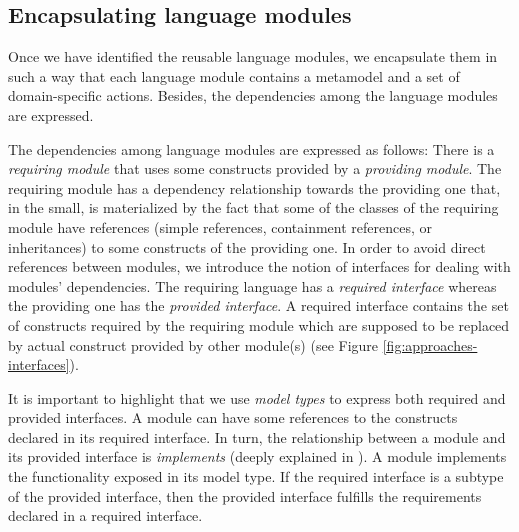 
\subsection{Encapsulating language modules}

Once we have identified the reusable language modules, we encapsulate them in such a way that each language module contains a metamodel and a set of domain-specific actions. Besides, the dependencies among the language modules are expressed. %

The dependencies among language modules are expressed as follows: There is a \textit{requiring module} that uses some constructs provided by a \textit{providing module}. The requiring module has a dependency relationship towards the providing one that, in the small, is materialized by the fact that some of the classes of the requiring module have references (simple references, containment references, or inheritances) to some constructs of the providing one. In order to avoid direct references between modules, we introduce the notion of interfaces for dealing with modules' dependencies. The requiring language has a \textit{required interface} whereas the providing one has the \textit{provided interface}. A required interface contains the set of constructs required by the requiring module which are supposed to be replaced by actual construct provided by other module(s) (see Figure \ref{fig:approaches-interfaces}).

It is important to highlight that we use \textit{model types} \cite{Steel:2007} to express both required and provided interfaces. A module can have some references to the constructs declared in its required interface. In turn, the relationship between a module and its provided interface is \textit{implements} (deeply explained in \cite{Degueule:2015}). A module implements the functionality exposed in its model type. If the required interface is a subtype of the provided interface, then the provided interface fulfills the requirements declared in a required interface. 

